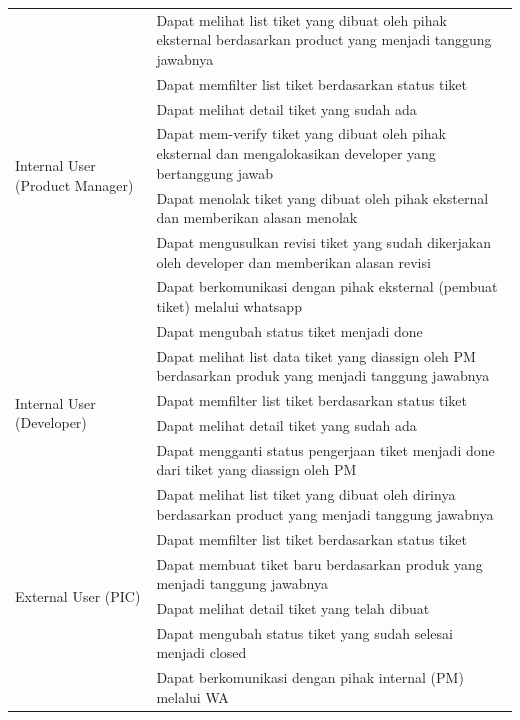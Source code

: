 \documentclass[12pt]{article}
\begin{document}
\begin{enumerate}[label=\textbf{4.\arabic*.}]
\begin{enumerate}[label=\textbf{4.1.\arabic*.}]
\begin{longtable}{|l|p{}|}
            \multirow{8}{*}{Internal User (Product Manager)} 
            & Dapat melihat list tiket yang dibuat oleh pihak eksternal berdasarkan product yang menjadi tanggung jawabnya \\\cline{2-2}
            & Dapat memfilter list tiket berdasarkan status tiket \\\cline{2-2} 
            & Dapat melihat detail tiket yang sudah ada \\\cline{2-2}
            & Dapat mem-verify tiket yang dibuat oleh pihak eksternal dan 
            mengalokasikan developer yang bertanggung jawab \\\cline{2-2}
            & Dapat menolak tiket yang dibuat oleh pihak eksternal dan memberikan alasan menolak \\\cline{2-2}
            & Dapat mengusulkan revisi tiket yang sudah dikerjakan oleh developer dan memberikan alasan revisi \\\cline{2-2}
            & Dapat berkomunikasi dengan pihak eksternal (pembuat tiket) melalui whatsapp \\\cline{2-2}
            & Dapat mengubah status tiket menjadi done \\\cline{2-2}
            \hline
            \multirow{4}{*}{Internal User (Developer)} & Dapat melihat list data tiket yang diassign oleh PM berdasarkan produk yang menjadi tanggung jawabnya \\\cline{2-2}
            & Dapat memfilter list tiket berdasarkan status tiket \\\cline{2-2}
            & Dapat melihat detail tiket yang sudah ada \\\cline{2-2}
            & Dapat mengganti status pengerjaan tiket menjadi done dari tiket yang diassign oleh PM \\\cline{2-2}
            \hline
            \multirow{7}{*}{External User (PIC)} & Dapat melihat list tiket yang dibuat oleh dirinya berdasarkan product yang menjadi tanggung jawabnya \\\cline{2-2}
            & Dapat memfilter list tiket berdasarkan status tiket \\\cline{2-2}
            & Dapat membuat tiket baru berdasarkan produk yang menjadi tanggung jawabnya \\\cline{2-2}
            & Dapat melihat detail tiket yang telah dibuat \\\cline{2-2}
            & Dapat mengubah status tiket yang sudah selesai menjadi closed \\\cline{2-2}
            & Dapat berkomunikasi dengan pihak internal (PM) melalui WA \\\cline{2-2}
            \hline


\end{longtable}
\end{enumerate}
\end{enumerate}
\end{document}
